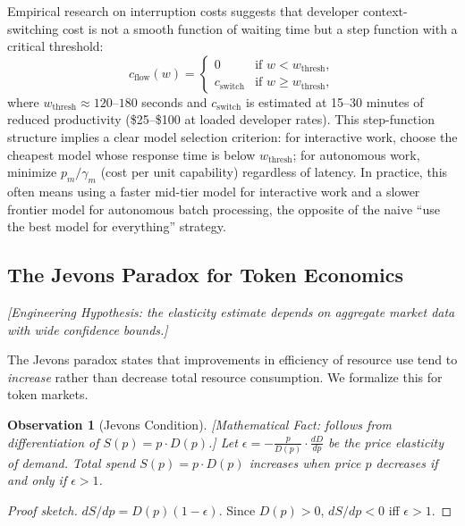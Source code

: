 \documentclass[11pt, a4paper]{googledeepmind}
\newtheorem{observation}{Observation}[section]
\begin{document}
Empirical research on interruption costs \citep{mark2008interrupted, leroy2009} suggests that developer context-switching cost is not a smooth function of waiting time but a step function with a critical threshold:
\begin{equation}\label{eq:econ-flow-state}
    c_{\text{flow}}(w) = \begin{cases}
        0 & \text{if } w < w_{\text{thresh}}, \\
        c_{\text{switch}} & \text{if } w \geq w_{\text{thresh}},
    \end{cases}
\end{equation}
where $w_{\text{thresh}} \approx 120$--$180$ seconds and $c_{\text{switch}}$ is estimated at 15--30 minutes of reduced productivity (\$25--\$100 at loaded developer rates). This step-function structure implies a clear model selection criterion: for interactive work, choose the cheapest model whose response time is below $w_{\text{thresh}}$; for autonomous work, minimize $p_m / \gamma_m$ (cost per unit capability) regardless of latency. In practice, this often means using a faster mid-tier model for interactive work and a slower frontier model for autonomous batch processing, the opposite of the naive ``use the best model for everything'' strategy.

\subsection{The Jevons Paradox for Token Economics}

\emph{[Engineering Hypothesis: the elasticity estimate depends on aggregate market data with wide confidence bounds.]}

The Jevons paradox \citep{jevons1865} states that improvements in efficiency of resource use tend to \emph{increase} rather than decrease total resource consumption. We formalize this for token markets.

\begin{observation}[Jevons Condition]
\label{thm:econ-jevons}
\emph{[Mathematical Fact: follows from differentiation of $S(p) = p \cdot D(p)$.]}
Let $\epsilon = -\frac{p}{D(p)} \cdot \frac{dD}{dp}$ be the price elasticity of demand. Total spend $S(p) = p \cdot D(p)$ increases when price $p$ decreases if and only if $\epsilon > 1$.
\end{observation}

\begin{proof}[Proof sketch]
$dS/dp = D(p)(1 - \epsilon)$. Since $D(p) > 0$, $dS/dp < 0$ iff $\epsilon > 1$.
\end{proof}
\end{document}
